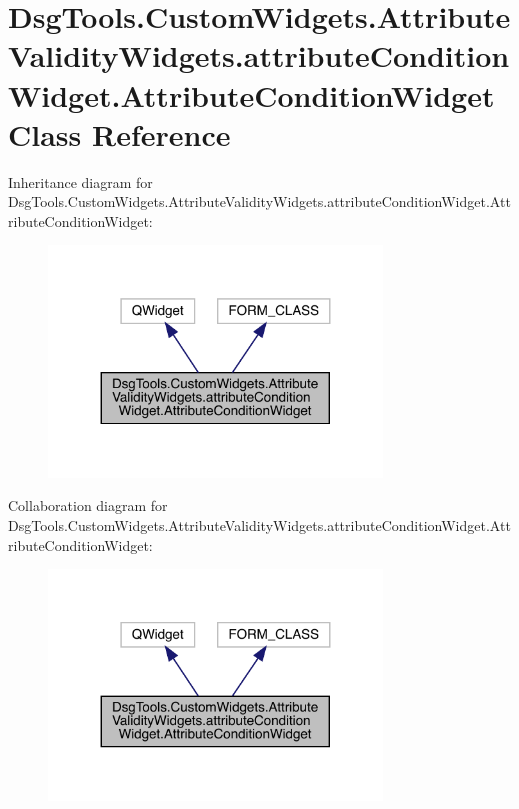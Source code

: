 \hypertarget{class_dsg_tools_1_1_custom_widgets_1_1_attribute_validity_widgets_1_1attribute_condition_widget_1_1_attribute_condition_widget}{}\section{Dsg\+Tools.\+Custom\+Widgets.\+Attribute\+Validity\+Widgets.\+attribute\+Condition\+Widget.\+Attribute\+Condition\+Widget Class Reference}
\label{class_dsg_tools_1_1_custom_widgets_1_1_attribute_validity_widgets_1_1attribute_condition_widget_1_1_attribute_condition_widget}


Inheritance diagram for Dsg\+Tools.\+Custom\+Widgets.\+Attribute\+Validity\+Widgets.\+attribute\+Condition\+Widget.\+Attribute\+Condition\+Widget\+:
\nopagebreak
\begin{figure}[H]
\begin{center}
\leavevmode
\includegraphics[width=251pt]{class_dsg_tools_1_1_custom_widgets_1_1_attribute_validity_widgets_1_1attribute_condition_widget_2d29281f9aa6388802ca7d3600ac3813}
\end{center}
\end{figure}


Collaboration diagram for Dsg\+Tools.\+Custom\+Widgets.\+Attribute\+Validity\+Widgets.\+attribute\+Condition\+Widget.\+Attribute\+Condition\+Widget\+:
\nopagebreak
\begin{figure}[H]
\begin{center}
\leavevmode
\includegraphics[width=251pt]{class_dsg_tools_1_1_custom_widgets_1_1_attribute_validity_widgets_1_1attribute_condition_widget_4efadbb202392ea80d5779905e93c969}
\end{center}
\end{figure}
